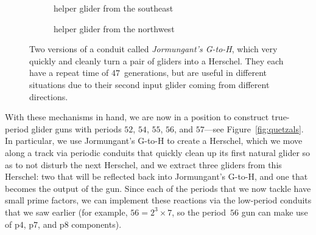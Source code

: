 \begin{figure}[!htb]
	\centering
	\begin{subfigure}{0.48\textwidth}
		\centering
		\caption{helper glider from the southeast}
		\label{fig:2G_to_Ha}
	\end{subfigure} \hfill \begin{subfigure}{.48\textwidth}
		\centering
		\caption{helper glider from the northwest}
		\label{fig:2G_to_Hb}
	\end{subfigure}
	\caption{Two versions of a conduit called \emph{Jormungant's G-to-H}, which very quickly and cleanly turn a pair of gliders into a Herschel. They each have a repeat time of $47$~generations, but are useful in different situations due to their second input glider coming from different directions.}\label{fig:2G_to_H}
\end{figure}

With these mechanisms in hand, we are now in a position to construct true-period glider guns with periods $52$, $54$, $55$, $56$, and $57$---see Figure~\ref{fig:quetzals}. In particular, we use Jormungant's G-to-H to create a Herschel, which we move along a track via periodic conduits that quickly clean up its first natural glider so as to not disturb the next Herschel, and we extract three gliders from this Herschel: two that will be reflected back into Jormungant's G-to-H, and one that becomes the output of the gun. Since each of the periods that we now tackle have small prime factors, we can implement these reactions via the low-period conduits that we saw earlier (for example, $56 = 2^3 \times 7$, so the period~$56$ gun can make use of p$4$, p$7$, and p$8$ components).

